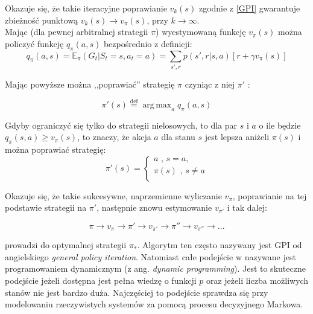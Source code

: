 \documentclass[licencjacka]{pracamgr}
\DeclareMathOperator*{\argmax}{arg\,max}
\begin{document}
Okazuje się, że takie iteracyjne poprawianie $v_{k}(s)$ zgodnie z \ref{GPI} gwarantuje zbieżność punktową $v_{k}(s)\rightarrow v_{\pi}(s)$, przy $k\rightarrow\infty$.\\

Mając (dla pewnej arbitralnej strategii $\pi$) wyestymowaną funkcję $v_{\pi}(s)$  można policzyć  funkcję $q_{\pi}(a,s)$ bezpośrednio z definicji:
$$q_{\pi}(a,s)=\mathbb{E}_{\pi}(G_{t}| S_{t} = s, a_{t} = a)  =  \sum_{s',r}p(s',r|s, a)[r+\gamma v_{\pi}(s)]$$

Mając powyższe można  ,,poprawiać'' strategię $\pi$ czyniąc z niej $\pi'$ : 

\begin{equation}\label{update1}
	\pi'(s)\stackrel{\text{def}}{=}\argmax_{a}q_{\pi}(a,s)
\end{equation}


Gdyby ograniczyć się tylko do strategii nielosowych, to dla par  $s$ i $a$ o ile będzie $q_{\pi}(s,a)\geq v_{\pi}(s)$, to znaczy, że akcja $a$  dla stanu $s$ jest lepsza aniżeli $\pi(s)$ i można poprawiać strategię: 
$$\pi'(s) =
	\begin{cases}
		a\text{ ,  }s=a,\\			
		\pi(s)\text{ , } s\neq a\\
	\end{cases}
$$

Okazuje się, że takie sukcesywne, naprzemienne wyliczanie $v_{\pi}$, poprawianie na tej podstawie strategii na $\pi'$, następnie znowu estymowanie $v_{\pi'}$ i tak dalej:

\begin{equation}\label{update2}
 	\pi\rightarrow v_{\pi}\rightarrow \pi' \rightarrow v_{\pi'} \rightarrow \pi'' \rightarrow v_{\pi''} \rightarrow...
\end{equation}


prowadzi do optymalnej strategii $\pi_{*}$.  Algorytm ten często nazywany jest GPI od angielskiego \textit{general policy iteration}. Natomiast całe podejście w \cite{RL} nazywane jest programowaniem dynamicznym (z ang. \textit{dynamic programming}). Jest to skuteczne podejście jeżeli dostępna jest  pełna wiedzę o funkcji $p$ oraz jeżeli liczba możliwych stanów nie jest bardzo duża. Najczęściej to podejście sprawdza się przy modelowaniu rzeczywistych systemów za pomocą procesu decyzyjnego Markowa.\\
\end{document}
